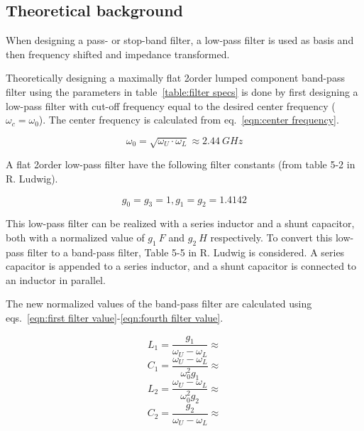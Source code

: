 \documentclass[report.tex]{subfiles}
\begin{document}
\subsection{Theoretical background}
When designing a pass- or stop-band filter, a low-pass filter is used as basis and then frequency shifted and impedance transformed. 

Theoretically designing a maximally flat 2\nd order lumped component band-pass filter using the parameters in table~\ref{table:filter specs} is done by first designing a low-pass filter with cut-off frequency equal to the desired center frequency ($\omega_c=\omega_0$). The center frequency is calculated from eq.~\ref{eqn:center frequency}.

\begin{equation}
    \omega_0 = \sqrt{\omega_U \cdot \omega_L} \approx 2.44~GHz
    \label{eqn:center frequency}
\end{equation}

A flat 2\nd order low-pass filter have the following filter constants (from table 5-2 in R. Ludwig).

\begin{equation*}
    g_0=g_3=1, g_1=g_2=1.4142
\end{equation*}

This low-pass filter can be realized with a series inductor and a shunt capacitor, both with a normalized value of $g_1~F$ and $g_2~H$ respectively. To convert this low-pass filter to a band-pass filter, Table 5-5 in R. Ludwig is considered. A series capacitor is appended to a series inductor, and a shunt capacitor is connected to an inductor in parallel.

The new normalized values of the band-pass filter are calculated using eqs.~\ref{eqn:first filter value}-\ref{eqn:fourth filter value}.

\begin{equation}
    \label{eqn:first filter value}
    L_1=\frac{g_1}{\omega_U-\omega_L} \approx 
\end{equation}
\begin{equation}
    C_1=\frac{\omega_U-\omega_L}{\omega_0^2 g_1} \approx
\end{equation}
\begin{equation}
    L_2=\frac{\omega_U-\omega_L}{\omega_0^2 g_2} \approx
\end{equation}
\begin{equation}
    \label{eqn:fourth filter value}
    C_2=\frac{g_2}{\omega_U-\omega_L} \approx
\end{equation}
\end{document}
